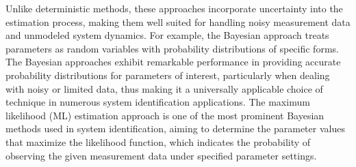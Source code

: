 Unlike deterministic methods, these approaches incorporate uncertainty into the estimation process, making them well suited for handling noisy measurement data and unmodeled system dynamics. For example, the Bayesian approach \cite{bernardo2009bayesian} treats parameters as random variables with probability distributions of specific forms. 
The Bayesian approaches exhibit remarkable performance in providing accurate probability distributions for parameters of interest, particularly when dealing with noisy or limited data, thus making it a universally applicable choice of technique in numerous system identification applications. 
The maximum likelihood (ML) estimation approach \cite{rossi2018mathematical} is one of the most prominent Bayesian methods used in system identification, aiming to determine the parameter values that maximize the likelihood function, which indicates the probability of observing the given measurement data under specified parameter settings.
